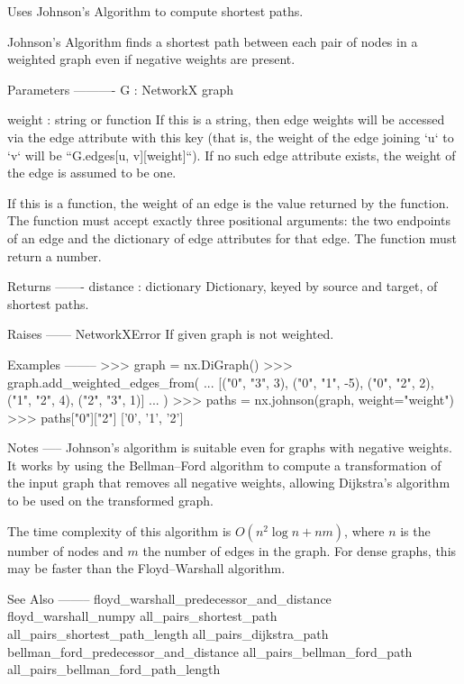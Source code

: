 \begin{DoxyVerb}Uses Johnson's Algorithm to compute shortest paths.

Johnson's Algorithm finds a shortest path between each pair of
nodes in a weighted graph even if negative weights are present.

Parameters
----------
G : NetworkX graph

weight : string or function
    If this is a string, then edge weights will be accessed via the
    edge attribute with this key (that is, the weight of the edge
    joining `u` to `v` will be ``G.edges[u, v][weight]``). If no
    such edge attribute exists, the weight of the edge is assumed to
    be one.

    If this is a function, the weight of an edge is the value
    returned by the function. The function must accept exactly three
    positional arguments: the two endpoints of an edge and the
    dictionary of edge attributes for that edge. The function must
    return a number.

Returns
-------
distance : dictionary
    Dictionary, keyed by source and target, of shortest paths.

Raises
------
NetworkXError
    If given graph is not weighted.

Examples
--------
>>> graph = nx.DiGraph()
>>> graph.add_weighted_edges_from(
...     [("0", "3", 3), ("0", "1", -5), ("0", "2", 2), ("1", "2", 4), ("2", "3", 1)]
... )
>>> paths = nx.johnson(graph, weight="weight")
>>> paths["0"]["2"]
['0', '1', '2']

Notes
-----
Johnson's algorithm is suitable even for graphs with negative weights. It
works by using the Bellman–Ford algorithm to compute a transformation of
the input graph that removes all negative weights, allowing Dijkstra's
algorithm to be used on the transformed graph.

The time complexity of this algorithm is $O(n^2 \log n + n m)$,
where $n$ is the number of nodes and $m$ the number of edges in the
graph. For dense graphs, this may be faster than the Floyd–Warshall
algorithm.

See Also
--------
floyd_warshall_predecessor_and_distance
floyd_warshall_numpy
all_pairs_shortest_path
all_pairs_shortest_path_length
all_pairs_dijkstra_path
bellman_ford_predecessor_and_distance
all_pairs_bellman_ford_path
all_pairs_bellman_ford_path_length\end{DoxyVerb}
 \mbox{\label{namespacenetworkx_1_1algorithms_1_1shortest__paths_1_1weighted_aee5f81cc7c6f46d1f11ec440ee37b930}} 
